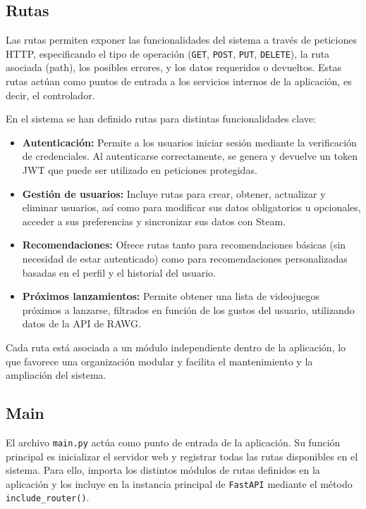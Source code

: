 \subsection{Rutas}

Las rutas permiten exponer las funcionalidades del sistema a través de peticiones HTTP, especificando el tipo de operación (\texttt{GET}, \texttt{POST}, \texttt{PUT}, \texttt{DELETE}), la ruta asociada (path), los posibles errores, y los datos requeridos o devueltos. Estas rutas actúan como puntos de entrada a los servicios internos de la aplicación, es decir, el controlador.

En el sistema se han definido rutas para distintas funcionalidades clave:

\begin{itemize}
	\item \textbf{Autenticación:} Permite a los usuarios iniciar sesión mediante la verificación de credenciales. Al autenticarse correctamente, se genera y devuelve un token JWT que puede ser utilizado en peticiones protegidas.
	
	\item \textbf{Gestión de usuarios:} Incluye rutas para crear, obtener, actualizar y eliminar usuarios, así como para modificar sus datos obligatorios u opcionales, acceder a sus preferencias y sincronizar sus datos con Steam.
	
	\item \textbf{Recomendaciones:} Ofrece rutas tanto para recomendaciones básicas (sin necesidad de estar autenticado) como para recomendaciones personalizadas basadas en el perfil y el historial del usuario.
	
	\item \textbf{Próximos lanzamientos:} Permite obtener una lista de videojuegos próximos a lanzarse, filtrados en función de los gustos del usuario, utilizando datos de la API de RAWG.
\end{itemize}

Cada ruta está asociada a un módulo independiente dentro de la aplicación, lo que favorece una organización modular y facilita el mantenimiento y la ampliación del sistema.

\subsection{Main}

El archivo \texttt{main.py} actúa como punto de entrada de la aplicación. Su función principal es inicializar el servidor web y registrar todas las rutas disponibles en el sistema. Para ello, importa los distintos módulos de rutas definidos en la aplicación y los incluye en la instancia principal de \texttt{FastAPI} mediante el método \texttt{include\_router()}.

